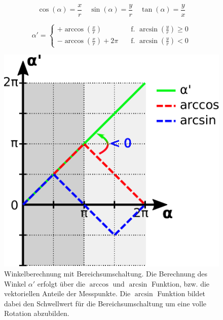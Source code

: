 \clearpage

%

\begin{equation}\label{eq:umrechnungpolar}
	\cos(\alpha) = \frac{x}{r} \quad\sin(\alpha) = \frac{y}{r} \quad\tan(\alpha) = \frac{y}{x}
\end{equation}

\begin{equation}
	\alpha' = 
	\begin{cases}
		+\arccos\left(\frac{x}{r}\right)        & \quad\text{f. } \arcsin\left(\frac{y}{r}\right) \ge 0\\
		-\arccos\left(\frac{x}{r}\right) + 2\pi & \quad\text{f. } \arcsin\left(\frac{y}{r}\right) < 0
	\end{cases}
\end{equation}


\begin{figure}[tbph]
	\centering
	\includegraphics[width=0.5\linewidth]{chapters/images/Winkelumrechnung_Polar}
	\caption[Winkelrückrechnung mit Bereichsumschaltung]{Winkelberechnung mit Bereichsumschaltung. Die Berechnung des 
	Winkel $\alpha'$ erfolgt über die $\arccos$ und $\arcsin$ Funktion, bzw. die vektoriellen Anteile der Messpunkte. 
	Die $\arcsin$ Funktion bildet dabei den Schwellwert für die Bereichsumschaltung um eine volle Rotation abzubilden.}
	\label{fig:winkelumrechnungpolar}
\end{figure}



